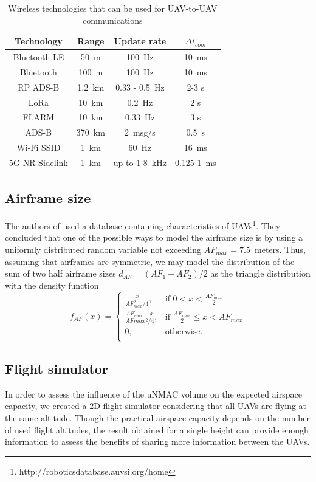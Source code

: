 \documentclass[conference]{IEEEtran}
\begin{document}
\begin{table}[t]
    \centering
        \caption{Wireless technologies that can be used for UAV-to-UAV communications}
    \begin{tabular}{c|c|c|c}
    Technology & {Range} & {Update rate}& $\Delta t_{com}$  \\
    \hline
    Bluetooth LE & 50~m & 100~Hz& 10~ms \\
    Bluetooth & 100~m & 100~Hz& 10~ms \\
    RP ADS-B \cite{consiglio2019sense}& 1.2~km & 0.33 - 0.5~Hz& 2-3 s  \\ 
    LoRa \cite{Vinogradov20} & 10~km & 0.2~Hz& 2 s  \\
    FLARM \cite{8514548}  & 10~km & 0.33~Hz & 3 s  \\
    ADS-B & 370~km & 2~msg/s & 0.5~s \\
    Wi-Fi SSID \cite{9133405}&1~km&60~Hz& 16~ms \\
    5G NR Sidelink \cite{9345798}&1~km& up to 1-8~kHz& 0.125-1~ms\\
    \end{tabular}

    \label{tab:techs}
\end{table}

\subsection{Airframe size}\label{sec:AF}
The authors of \cite{Weinert22} used a database containing characteristics of UAVs\footnote{http://roboticsdatabase.auvsi.org/home}. They concluded that one of the possible ways to model the airframe size is by using a uniformly distributed random variable not exceeding $AF_{max}=7.5$~meters. Thus, assuming that airframes are symmetric, we may model the distribution of the sum of two half airframe sizes $d_{AF}=(AF_1+AF_2)/2$ as the triangle distribution with the density function
\begin{equation}
  f_{AF}(x)=\begin{cases}
    \frac{x}{AF_{max}^2/4}, & \text{if $0<x<\frac{AF_{max}}{2}$}\\
    \frac{AF_{max}-x}{AF{max}^2/4}, & \text{if $\frac{AF_{max}}{2}\leq x<AF_{max}$}\\
    0, & \text{otherwise}.\\
  \end{cases}
\end{equation}
\subsection{Flight simulator}
In order to assess the influence of the uNMAC volume on the expected airspace capacity, we created a 2D flight simulator considering that all UAVs are flying at the same altitude. Though the practical airspace capacity depends on the number of used flight altitudes, the result obtained for a single height can provide enough information to assess the benefits of sharing more information between the UAVs. 
\end{document}

